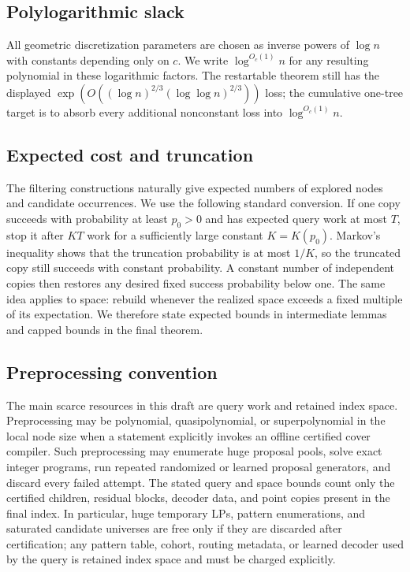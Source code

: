 \documentclass[10pt]{article}
\theoremstyle{definition}
\begin{document}
\subsection{Polylogarithmic slack}

All geometric discretization parameters are chosen as inverse powers of $\log n$ with constants depending only on $c$. We write $\log^{O_c(1)}n$ for any resulting polynomial in these logarithmic factors. The restartable theorem still has the displayed $\exp(O((\log n)^{2/3}(\log\log n)^{2/3}))$ loss; the cumulative one-tree target is to absorb every additional nonconstant loss into $\log^{O_c(1)}n$.

\subsection{Expected cost and truncation}

The filtering constructions naturally give expected numbers of explored nodes and candidate occurrences. We use the following standard conversion. If one copy succeeds with probability at least $p_0>0$ and has expected query work at most $T$, stop it after $K T$ work for a sufficiently large constant $K=K(p_0)$. Markov's inequality shows that the truncation probability is at most $1/K$, so the truncated copy still succeeds with constant probability. A constant number of independent copies then restores any desired fixed success probability below one. The same idea applies to space: rebuild whenever the realized space exceeds a fixed multiple of its expectation. We therefore state expected bounds in intermediate lemmas and capped bounds in the final theorem.

\subsection{Preprocessing convention}

The main scarce resources in this draft are query work and retained index
space.  Preprocessing may be polynomial, quasipolynomial, or superpolynomial in
the local node size when a statement explicitly invokes an offline certified
cover compiler.  Such preprocessing may enumerate huge proposal pools, solve
exact integer programs, run repeated randomized or learned proposal generators,
and discard every failed attempt.  The stated query and space bounds count only
the certified children, residual blocks, decoder data, and point copies present
in the final index.  In particular, huge temporary LPs, pattern enumerations,
and saturated candidate universes are free only if they are discarded after
certification; any pattern table, cohort, routing metadata, or learned decoder
used by the query is retained index space and must be charged explicitly.
\end{document}
